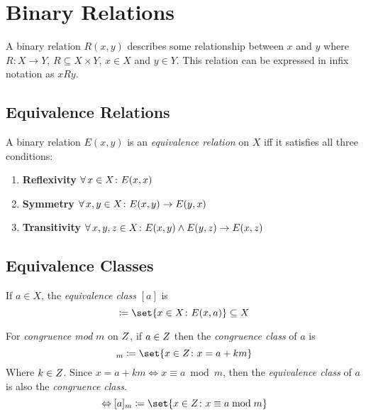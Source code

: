 \chapter{Binary Relations}

\begin{definition}
	A binary relation $R(x, y)$ describes some relationship between $x$ and $y$ where $R \colon X \to Y$, $R \subseteq X \times Y$, $x \in X$ and $y \in Y$. This relation can be expressed in infix notation as $xRy$.
\end{definition}

\section{Equivalence Relations}
\begin{definition}
	A binary relation $E(x, y)$ is an \textit{equivalence relation} on $X$ iff it satisfies all three conditions:
    \begin{enumerate}
        \item \textbf{Reflexivity}
            \subitem $\operatorname{\forall} x \in X \colon E(x, x)$
        \item \textbf{Symmetry}
            \subitem $\operatorname{\forall} x, y \in X \colon E(x, y) \to E(y, x)$
        \item \textbf{Transitivity}
            \subitem $\operatorname{\forall} x, y, z \in X \colon E(x, y) \land E(y, z) \to E(x, z)$
    \end{enumerate}
\end{definition}

\section{Equivalence Classes}
\begin{definition}
    If $a \in X$, the \textit{equivalence class} $[a]$ is
    \begin{equation}
        [a] \coloneqq \set{x \in X \colon E(x, a)} \subseteq X
    \end{equation}
\end{definition}

\begin{definition}
    For \textit{congruence mod} $m$ on $\relax{Z}$, if $a \in \relax{Z}$ then the \textit{congruence class} of $a$ is
    \begin{equation}
        [a]_m \coloneqq \set{x \in \Int \colon x = a + km}
    \end{equation}
    Where $k \in \relax{Z}$. Since $x = a + km \Leftrightarrow x \equiv a \bmod m$, then the \textit{equivalence class} of $a$ is also the \textit{congruence class}.
    \begin{equation}
        \Leftrightarrow [a]_m \coloneqq \set{x \in \Int \colon x \equiv a \bmod m}
    \end{equation}
\end{definition}

